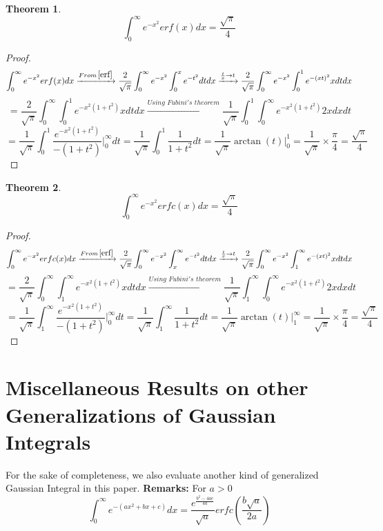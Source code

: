 \documentclass[a4paper,twoside,10pt]{article}
\newtheorem{theorem}{Theorem}[section]
\begin{document}
\begin{theorem}
\begin{equation}
\int_0^{\infty} e^{-x^2} erf(x) dx = \frac{\sqrt{\pi}}{4}   
\end{equation}
\end{theorem}
\begin{proof}
 \[ \int_0^{\infty} e^{-x^2} erf(x) dx \xrightarrow{From \, \eqref{erf}} \frac{2}{\sqrt{\pi}} \int_0^{\infty} e^{-x^2} \int_0^x e^{-t^2} dt dx \xrightarrow{\frac{t}{x}\rightarrow t} \frac{2}{\sqrt{\pi}} \int_0^{\infty} e^{-x^2} \int_0^1 e^{-(xt)^2} x dt dx \]
 \[ =\frac{2}{\sqrt{\pi}} \int_0^{\infty}\int_0^1 e^{-x^2(1+t^2)}x dt dx \xrightarrow{Using\,\, Fubini's\,\, theorem} \frac{1}{\sqrt{\pi}}\int_0^1\int_0^{\infty} e^{-x^2(1+t^2)}2x dx dt\]
 \[= \frac{1}{\sqrt{\pi}} \int_0^1 \frac{e^{-x^2(1+t^2)}}{-(1+t^2)} \Big|_0^{\infty} dt = \frac{1}{\sqrt{\pi}} \int_0^1 \frac{1}{1+t^2} dt = \frac{1}{\sqrt{\pi}} \arctan(t)\Big|_0^1 = \frac{1}{\sqrt{\pi}} \times \frac{\pi}{4}= \frac{\sqrt{\pi}}{4}    \]
 \end{proof}
 \begin{theorem}
\begin{equation}
 \int_0^{\infty} e^{-x^2} erfc(x) dx = \frac{\sqrt{\pi}}{4}    
\end{equation}
\end{theorem}
\begin{proof}
 \[ \int_0^{\infty} e^{-x^2} erfc(x) dx \xrightarrow{From \, \eqref{erf}} \frac{2}{\sqrt{\pi}} \int_0^{\infty} e^{-x^2} \int_x^{\infty} e^{-t^2} dt dx \xrightarrow{\frac{t}{x}\rightarrow t} \frac{2}{\sqrt{\pi}} \int_0^{\infty} e^{-x^2} \int_1^{\infty} e^{-(xt)^2} x dt dx \]
 \[ =\frac{2}{\sqrt{\pi}} \int_0^{\infty}\int_1^{\infty} e^{-x^2(1+t^2)}x dt dx \xrightarrow{Using\,\, Fubini's\,\, theorem} \frac{1}{\sqrt{\pi}}\int_1^{\infty}\int_0^{\infty} e^{-x^2(1+t^2)}2x dx dt\]
 \[= \frac{1}{\sqrt{\pi}} \int_1^{\infty} \frac{e^{-x^2(1+t^2)}}{-(1+t^2)} \Big|_0^{\infty} dt = \frac{1}{\sqrt{\pi}} \int_1^{\infty} \frac{1}{1+t^2} dt = \frac{1}{\sqrt{\pi}} \arctan(t)\Big|_1^{\infty} = \frac{1}{\sqrt{\pi}} \times \frac{\pi}{4}= \frac{\sqrt{\pi}}{4}    \]
\end{proof}
 \section{Miscellaneous Results on other Generalizations of Gaussian Integrals}
 For the sake of completeness, we also evaluate another kind of generalized Gaussian Integral in this paper. 
 \textbf{Remarks: }
 For   $a>0  $
 \begin{equation}\label{general}
 \int_0^{\infty} e^{-(ax^2+bx+c)} dx= \frac{e^{\frac{b^2-4ac}{4a}}}{\sqrt{a}} erfc\left({\frac{b\sqrt{a}}{2a}}\right)  
 \end{equation}
\end{document}
